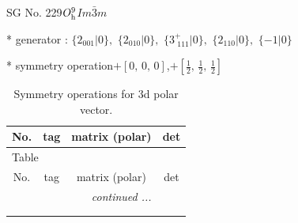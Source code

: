 \documentclass[fleqn,8pt]{jsarticle}
\begin{document}
\setcounter{MaxMatrixCols}{32}

\renewcommand{\tablename}{Table~}
\renewcommand{\figurename}{Figure~}
\begin{center}
\LARGE
SG No. 229\quad$O_{\rm h}^{9}$\quad$Im\bar{3}m$\quad[ cubic ]
\end{center}

* generator : $\{2{}_{001}|0\},\,\,\{2{}_{010}|0\},\,\,\{3^{+}_{\,\,111}|0\},\,\,\{2{}_{110}|0\},\,\,\{-1|0\}$

* symmetry operation\quad$+\left[ 0,\, 0,\, 0 \right]$,\quad $+\left[ \frac{1}{2},\, \frac{1}{2},\, \frac{1}{2} \right]$
\renewcommand{\arraystretch}{1.3}
\begin{longtable}{cccc}
\caption{Symmetry operations for 3d polar vector.}
 \\
 \hline \hline
No. & tag & matrix (polar) & det \\ \hline \endfirsthead

\multicolumn{3}{l}{\tablename\ \thetable{}} \\
 \hline \hline
No. & tag & matrix (polar) & det \\ \hline \endhead

 \hline \hline
\multicolumn{3}{r}{\footnotesize\it continued ...} \\ \endfoot

 \hline \hline
\multicolumn{3}{r}{} \\ \endlastfoot


\end{longtable}
\end{document}
